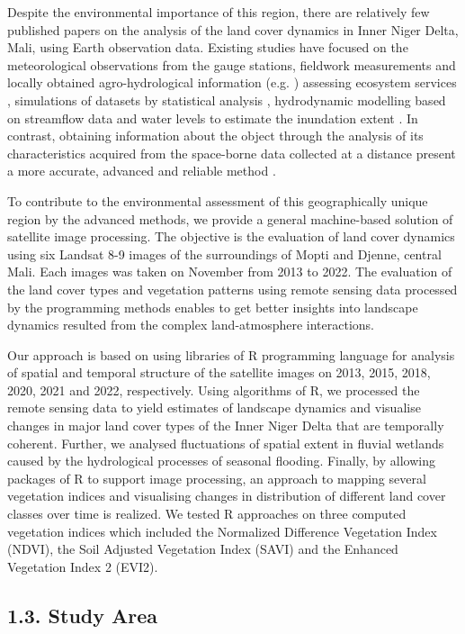 \documentclass[12pt,a4paper,oneside]{article}
\def \newpar{\vspace{6pt}}
\begin{document}
\newpar Despite the environmental importance of this region, there are relatively few published papers on the analysis of the land cover dynamics in Inner Niger Delta, Mali, using Earth observation data. Existing studies have focused on the meteorological observations from the gauge stations, fieldwork measurements and locally obtained agro-hydrological information (e.g. \citep{dadson2010wetland}) assessing ecosystem services \citep{REBELO201358}, simulations of datasets by statistical analysis \cite{Mascaro}, hydrodynamic modelling based on streamflow data and water levels to estimate the inundation extent \citep{HAQUE2020100703,HAQUE2021104187}. In contrast, obtaining information about the object through the analysis of its characteristics acquired from the space-borne data collected at a distance present a more accurate, advanced and reliable method \citep{Maini,rs70202127}. 

To contribute to the environmental assessment of this geographically unique region by the advanced methods, we provide a general machine-based solution of satellite image processing. The objective is the evaluation of land cover dynamics using six Landsat 8-9 images of the surroundings of Mopti and Djenne, central Mali. Each images was taken on November from 2013 to 2022. The evaluation of the land cover types and vegetation patterns using remote sensing data processed by the programming methods enables to get better insights into landscape dynamics resulted from the complex land-atmosphere interactions.

\newpar Our approach is based on using libraries of R programming language for analysis of spatial and temporal structure of the satellite images on 2013, 2015, 2018, 2020, 2021 and 2022, respectively. Using algorithms of R, we processed the remote sensing data to yield estimates of landscape dynamics and visualise changes in major land cover types of the Inner Niger Delta that are temporally coherent. Further, we analysed fluctuations of spatial extent in fluvial wetlands caused by the hydrological processes of seasonal flooding. Finally, by allowing packages of R to support image processing, an approach to mapping several vegetation indices and visualising changes in distribution of different land cover classes over time is realized. We tested R approaches on three computed vegetation indices which included the Normalized Difference Vegetation Index (NDVI), the Soil Adjusted Vegetation Index (SAVI) and the Enhanced Vegetation Index 2 (EVI2).

\subsection*{1.3. Study Area}
\end{document}
